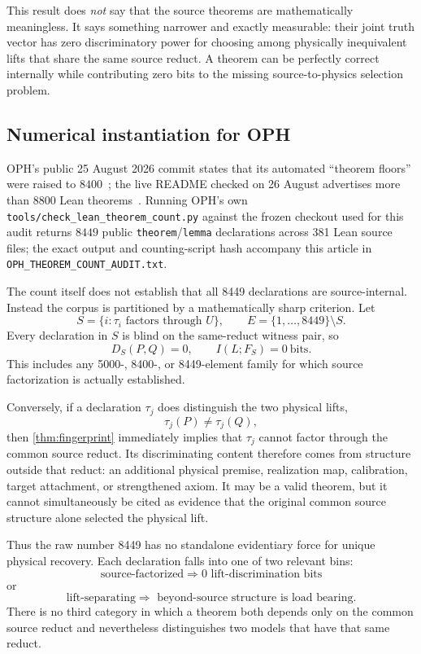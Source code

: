 \documentclass[10pt,a4paper]{article}
\theoremstyle{definition}
\theoremstyle{remark}
\begin{document}
\begin{warningbox}
This result does \emph{not} say that the source theorems are mathematically
meaningless.  It says something narrower and exactly measurable: their joint
truth vector has zero discriminatory power for choosing among physically
inequivalent lifts that share the same source reduct.  A theorem can be
perfectly correct internally while contributing zero bits to the missing
source-to-physics selection problem.
\end{warningbox}

\subsection{Numerical instantiation for OPH}

OPH's public 25 August 2026 commit states that its automated ``theorem floors''
were raised to \(8400\)~\cite{OPHTheoremFloor}; the live README checked on
26 August advertises more than \(8800\) Lean theorems~\cite{OPHCurrentREADME}.
Running OPH's own
\texttt{tools/check\_lean\_theorem\_count.py} against the frozen checkout used
for this audit returns \(8449\) public \texttt{theorem}/\texttt{lemma}
declarations across 381 Lean source files; the exact output and counting-script
hash accompany this article in \texttt{OPH\_THEOREM\_COUNT\_AUDIT.txt}.

The count itself does not establish that all 8449 declarations are
source-internal.  Instead the corpus is partitioned by a mathematically sharp
criterion.  Let
\[
S=\{i:\tau_i\text{ factors through }U\},
\qquad
E=\{1,\ldots,8449\}\setminus S.
\]
Every declaration in \(S\) is blind on the same-reduct witness pair, so
\[
D_S(P,Q)=0,
\qquad
I(L;F_S)=0\ \text{bits}.
\]
This includes any 5000-, 8400-, or 8449-element family for which source
factorization is actually established.

Conversely, if a declaration \(\tau_j\) does distinguish the two physical
lifts,
\[
\tau_j(P)\neq\tau_j(Q),
\]
then \cref{thm:fingerprint} immediately implies that \(\tau_j\) cannot factor
through the common source reduct.  Its discriminating content therefore comes
from structure outside that reduct: an additional physical premise,
realization map, calibration, target attachment, or strengthened axiom.  It
may be a valid theorem, but it cannot simultaneously be cited as evidence that
the original common source structure alone selected the physical lift.

Thus the raw number 8449 has no standalone evidentiary force for unique
physical recovery.  Each declaration falls into one of two relevant bins:
\[
\boxed{\text{source-factorized}\Rightarrow 0\text{ lift-discrimination bits}}
\]
or
\[
\boxed{\text{lift-separating}\Rightarrow\text{ beyond-source structure is load bearing}.}
\]
There is no third category in which a theorem both depends only on the common
source reduct and nevertheless distinguishes two models that have that same
reduct.
\end{document}
